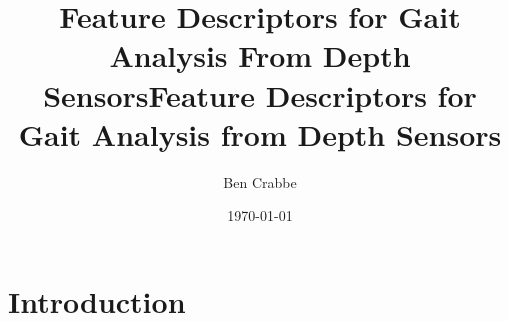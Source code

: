 \documentclass[11pt]{article} %
\title{%
Feature Descriptors for Gait Analysis From Depth Sensors}
\newcommand{\comment}[1]{}
\begin{document}
\maketitle
\tableofcontents
\comment{

A statement of the aims and objectives of the project.


A description of the background and context of the project and its relation to work already done in the area. (Note that while you are free to re-use work from your research review here, it would normally be appropriate to tailor your earlier work to better suport the final contributions of the project. Typically you will include new related work which was found to be important, while excluding previously studied work which has become irrelevant, and modifying your earlier write-up with more or less detail, as required).



A description of the work carried out. This should include details of technical or scientific problems tackled, solutions proposed, and the design and development of software.



A description and analysis of results obtained.



A critical evaluation of the work. This is an analysis of the extent to which the project has achieved its objectives, and whether the choices that were made were, with hindsight, the best ones.
Suggestions on possible improvements and/or further work.


	Introduction:
		Discuss SPHERE, the need for in home gait analysis, references that show this is possible from kinect, 
	The existing pipeline:
		Kinect SDK skeletons... shotton et al.
		same as lit review, but go into more detail on the dimensionality reduction/manifold method
	

}

\title{Feature Descriptors for Gait Analysis from Depth Sensors}



\author{Ben Crabbe}

\date{\today}





\section{Introduction}
\end{document}
